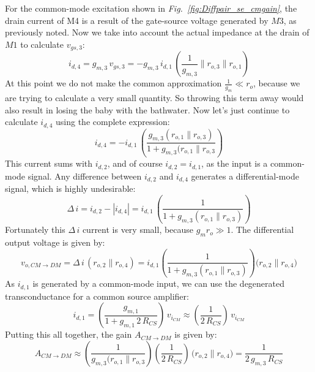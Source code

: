 For the common-mode excitation shown in \emph{Fig.~\ref{fig:Diffpair_se_cmgain}}, the drain current of M4 is a result of the gate-source voltage generated by $M3$, as previously noted.  Now we take into account the actual impedance at the drain of $M1$ to calculate $v_{gs,3}$:
    \begin{equation}
        i_{d,4} = g_{m,3}\,v_{gs,3} = -g_{m,3}\,i_{d,1}\,\left(\frac{1}{g_{m,3}} \parallel r_{o,3} \parallel r_{o,1}\right)
    \end{equation}
At this point we do not make the common approximation $\frac{1}{g_m} \ll r_o$, because we are trying to calculate a very small quantity.  So throwing this term away would also result in losing the baby with the bathwater.  Now let's just continue to calculate $i_{d,4}$ using the complete expression:
    \begin{equation}
        i_{d,4} = -i_{d,1}\,\left(\frac{g_{m,3}(r_{o,1} \parallel r_{o,3})} {1 + g_{m,3}(r_{o,1} \parallel r_{o,3}}\right)
    \end{equation}
This current sums with $i_{d,2}$, and of course $i_{d,2} = i_{d,1}$, as the input is a common-mode signal. Any difference between $i_{d,2}$ and $i_{d,4}$ generates a differential-mode signal, which is highly undesirable:
    \begin{equation}
        \Delta\,i = i_{d,2} - \left|i_{d,4}\right|
        = i_{d,1}\,\left(\frac{1}{1 + g_{m,3}(r_{o,1} \parallel r_{o,3})}\right)
    \end{equation}
Fortunately this $\Delta\,i$ current is very small, because $g_m r_o \gg 1$.  The differential output voltage is given by:
    \begin{equation}
        v_{o,CM \to DM} = \Delta\,i\,\left(r_{o,2} \parallel r_{o,4}\right)
        = i_{d,1}\left(\frac{1}{1 + g_{m,3}(r_{o,1} \parallel r_{o,3})}\right)\big(r_{o,2} \parallel r_{o,4}\big)
    \end{equation}
As $i_{d,1}$ is generated by a common-mode input, we can use the degenerated transconductance for a common source amplifier:
    \begin{equation}
        i_{d,1} = \left(\frac{g_{m,1}}{1 + g_{m,1}\,2\,R_{CS}}\right)\,v_{i_{CM}}
        \approx \left(\frac{1}{2\,R_{CS}}\right)\,v_{i_{CM}}
    \end{equation}
Putting this all together, the gain $A_{CM \to DM}$ is given by:
    \begin{equation}
        A_{CM \to DM} \approx \left(\frac{1}{g_{m,3}(r_{o,1} \parallel r_{o,3}}\right)
                                \left(\frac{1}{2\,R_{CS}}\right)\,\big(r_{o,2} \parallel r_{o,4}\big)
        = \frac{1}{2\,g_{m,3}\,R_{CS}}
    \end{equation}
